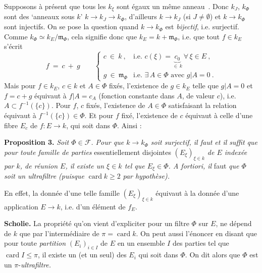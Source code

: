 \documentclass[11pt]{article}
\newcommand{\printedpage}[1]{\marginpar{\footnotesize p.~#1}}
\newcommand{\msp}[1]{\marginpar{\footnotesize [#1]}}
\begin{document}
\printedpage{195}

\msp{page 9}
Supposons à présent que tous les $k_\xi$ sont égaux un même anneau \,. Donc $k_J$, $k_\Phi$ sont des `anneaux sous $k$' $k\longrightarrow k_J\longrightarrow k_\Phi$, d'ailleurs $k\longrightarrow k_J$ (si $J\neq\emptyset$) et $k\longrightarrow k_\Phi$ sont injectifs. On se pose la question quand $k\longrightarrow k_\Phi$ est \textit{bijectif}, i.e. surjectif. Comme $k_\Phi\simeq k_E/\mathfrak{m}_\Phi$, cela signifie donc que $k_E=k+\mathfrak{m}_\Phi$, i.e. que tout $f\in k_E$ s'écrit
\[
f\ =\ c\ +\ g\qquad
\begin{cases}
c\ \in\ k\ , & \text{i.e. } c(\xi)=\underbrace{c_0}_{\in\,k}\ \forall\,\xi\in E\ ,\\[2ex]
g\ \in\ \mathfrak{m}_\Phi & \text{i.e. } \exists\,A\in\Phi \text{ avec } g|A=0\ .
\end{cases}
\]
Mais pour $f\in k_E$, $c\in k$ et $A\in\Phi$ fixés, l'existence de $g\in k_E$ telle que $g|A=0$ et $f=c+g$ équivaut à $f|A=c_A$ (fonction constante dans $A$, de valeur $c$), i.e. $A\subset f^{-1}(\{c\})$. Pour $f$, $c$ fixés, l'existence de $A\in\Phi$ satisfaisant la relation équivaut à $f^{-1}(\{c\})\in\Phi$. Et pour $f$ fixé, l'existence de $c$ équivaut à celle d'une fibre $E_c$ de $f:E\longrightarrow k$, qui soit dans $\Phi$. Ainsi :

\textbf{Proposition 3.} \textit{Soit $\Phi\in\mathcal{F}$. Pour que $k\longrightarrow k_\Phi$ soit surjectif, il faut et il suffit que pour toute famille de parties} essentiellement disjointes \textit{$(E_\xi)_{\xi\in k}$ de $E$ indexée par $k$, de réunion $E$, il existe un $\xi\in k$ tel que $E_\xi\in\Phi$. A fortiori, il} faut \textit{que $\Phi$ soit un ultrafiltre (puisque} $\operatorname{card}k\geqslant 2$ \textit{par hypothèse).}

\msp{page 10}
En effet, la donnée d'une telle famille $(E_\xi)_{\xi\in k}$ équivaut à la donnée d'une application $E\longrightarrow k$, i.e. d'un élément de $f_E$. %

\textbf{Scholie.} La propriété qu'on vient d'expliciter pour un filtre $\Phi$ sur $E$, ne dépend de $k$ que par l'intermédiaire de $\pi=\operatorname{card}k$. On peut aussi l'énoncer en disant que pour toute \textit{partition} $(E_i)_{i\in I}$ de $E$ en un ensemble $I$ des parties tel que $\operatorname{card}I\leqslant\pi$, il existe un (et un seul) des $E_i$ qui soit dans $\Phi$. On dit alors que $\Phi$ est un $\pi$-\textit{ultrafiltre.}
\end{document}
